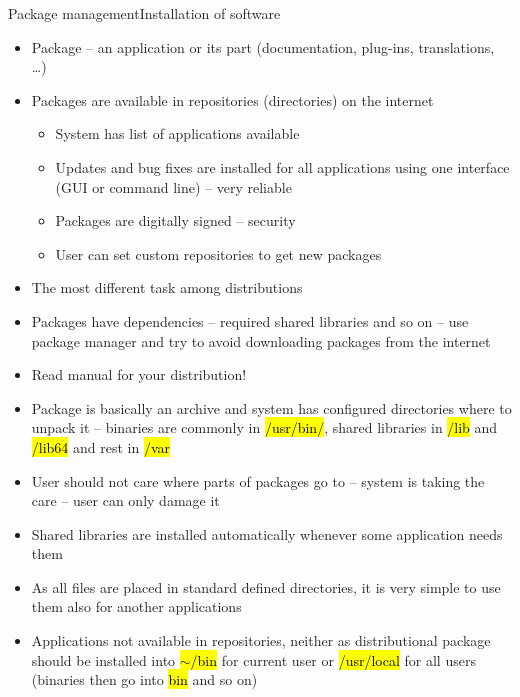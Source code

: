 \documentclass[compress, ucs, xelatex, 11pt, xcolor=svgnames,
  hyperref={
    bookmarks=true,
    unicode=true,
    colorlinks=true,
    pdftitle={Linux, command line and MetaCentrum},
    plainpages=false,
    pdfauthor={Vojtech Zeisek},
    pdfsubject={Course about use of Linux command line, writing shell scripts and using MetaCentrum of CESNET},
    pdfcreator={XeLaTeX},
    pdfkeywords={Linux, GNU, BASH, shell, command line, MetaCentrum},
    linkcolor=Red,
    anchorcolor=Blue,
    citecolor=Purple,
    filecolor=DodgerBlue,
    menucolor=DarkOrchid,
    urlcolor=DeepSkyBlue,
    pdftex},
  url={hyphens, lowtilde} %
  ]{beamer}
\renewcommand{\texttt}[1]{\hl{\ttfamily #1}}
\begin{document}
\begin{frame}[allowframebreaks]{Package management}{Installation of software}
  \begin{itemize}
    \item Package -- an application or its part (documentation, plug-ins, translations, \ldots)
    \item Packages are available in repositories (directories) on the internet
    \begin{itemize}
      \item System has list of applications available
      \item Updates and bug fixes are installed for all applications using one interface (GUI or command line) -- very reliable
      \item Packages are digitally signed -- security
      \item User can set custom repositories to get new packages
    \end{itemize}
    \item The most different task among distributions
    \item Packages have dependencies -- required shared libraries and so on -- use package manager and try to avoid downloading packages from the internet
    \item \alert{Read manual for your distribution!}
    \item Package is basically an archive and system has configured directories where to unpack it -- binaries are commonly in \texttt{/usr/bin/}, shared libraries in \texttt{/lib} and \texttt{/lib64} and rest in \texttt{/var}
    \item User should not care where parts of packages go to -- system is taking the care -- user can only damage it
    \item Shared libraries are installed automatically whenever some application needs them
    \item As all files are placed in standard defined directories, it is very simple to use them also for another applications
    \item Applications not available in repositories, neither as distributional package should be installed into \texttt{$\sim$/bin} for current user or \texttt{/usr/local} for all users (binaries then go into \texttt{bin} and so on)
  \end{itemize}
\end{frame}
\end{document}
